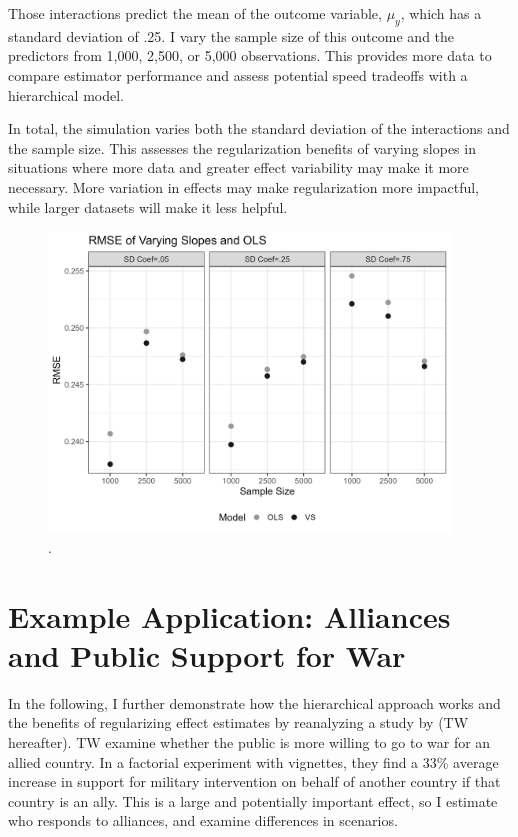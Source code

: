 \documentclass[12pt]{article}
\begin{document}
Those interactions predict the mean of the outcome variable, $\mu_y$, which has a standard deviation of .25. 
I vary the sample size of this outcome and the predictors from 1,000, 2,500, or 5,000 observations. 
This provides more data to compare estimator performance and assess potential speed tradeoffs with a hierarchical model.


In total, the simulation varies both the standard deviation of the interactions and the sample size. 
This assesses the regularization benefits of varying slopes in situations where more data and greater effect variability may make it more necessary.
More variation in effects may make regularization more impactful, while larger datasets will make it less helpful.


\begin{figure}[htpb]
	\centering
		\includegraphics[width=0.95\textwidth]{../figures/sim-rmse.png}
	\caption{.}
	\label{fig:sim-rmse}
\end{figure}


\section{Example Application: Alliances and Public Support for War} 


In the following, I further demonstrate how the hierarchical approach works and the benefits of regularizing effect estimates by reanalyzing a study by \citet{TomzWeeks2021} (TW hereafter). 
TW examine whether the public is more willing to go to war for an allied country.
In a factorial experiment with vignettes, they find a 33\% average increase in support for military intervention on behalf of another country if that country is an ally. 
This is a large and potentially important effect, so I estimate who responds to alliances, and examine differences in scenarios.
\end{document}
